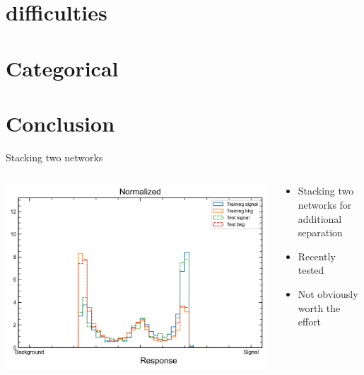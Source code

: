 \documentclass[10pt, UKenglish]{beamer}
\begin{document}
\section{\tZq difficulties}

\section{Categorical}



\section{Conclusion}

\begin{frame}{Stacking two networks}
  \begin{columns}
    \begin{column}{0.65\textwidth}
      \includegraphics[width=\textwidth]{stacked}
    \end{column}
    \begin{column}{0.35\textwidth}
      \begin{itemize}
        \item Stacking two networks for additional \tZq separation
        \item Recently tested
        \item Not obviously worth the effort
      \end{itemize}
    \end{column}
  \end{columns}
\end{frame}
\end{document}

